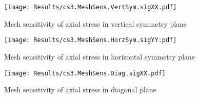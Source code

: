 \documentclass[twocolumn,10pt]{asme2ej}
\begin{document}
\clearpage
\begin{figure}[htb]
\begin{center}
\texttt{[image: Results/cs3.MeshSens.VertSym.sigXX.pdf]}
\caption{Mesh sensitivity of axial stress in vertical symmetry plane}
\texttt{[image: Results/cs3.MeshSens.HorzSym.sigYY.pdf]}
\caption{Mesh sensitivity of axial stress in horizontal symmetry plane}
\texttt{[image: Results/cs3.MeshSens.Diag.sigXX.pdf]}
\caption{Mesh sensitivity of axial stress in diagonal plane}
\end{center}
\end{figure}
\end{document}
